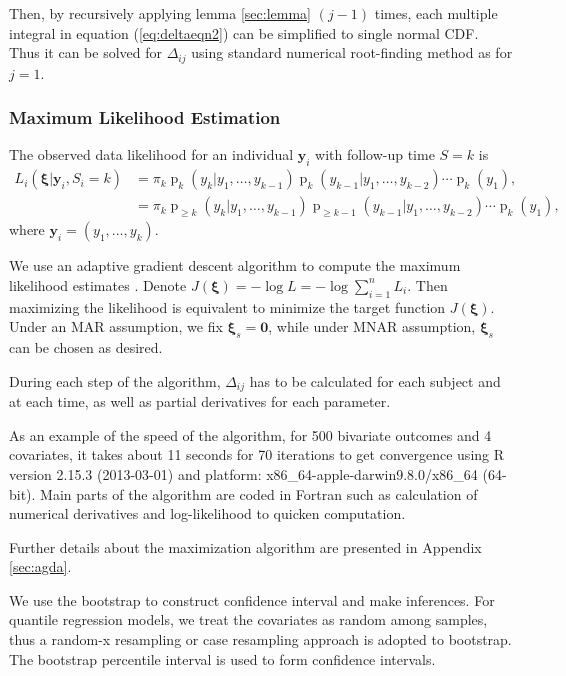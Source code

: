 \documentclass[12pt]{article}
\DeclareMathOperator{\pr}{p}
\begin{document}
\begin{itemize}
  Then, by recursively applying lemma \ref{sec:lemma} $(j-1)$ times,
  each multiple integral in equation (\ref{eq:deltaeqn2}) can be
  simplified to single normal CDF. Thus it can be solved for
  $\Delta_{ij}$ using standard numerical root-finding method as for $j
  = 1$.

\end{itemize}

\subsubsection{Maximum Likelihood Estimation}
\label{sec:mle}

The observed data likelihood for an individual $\bm y_i$ with
follow-up time $S = k$ is
\begin{align} \label{eq:ll} L_i(\bm \xi| \bm y_i, S_{i} = k) & =
  \pi_k\pr_k (y_k | y_1, \ldots, y_{k-1})
  \pr_k (y_{k-1}|y_1, \ldots, y_{k-2}) \cdots \pr_{k} (y_1), \\
  & = \pi_k \pr_{\geq k} (y_k | y_1, \ldots, y_{k-1}) \pr_{\geq k-1}
  (y_{k-1}|y_1, \ldots, y_{k-2}) \cdots \pr_{k} (y_1), \nonumber
\end{align}
where $\bm y_i = (y_1, \ldots, y_k)$.

We use an adaptive gradient descent algorithm to compute the maximum
likelihood estimates \citep{ried1993}. Denote $J(\bm \xi) = - \log L =
- \log \sum_{i = 1}^n L_i$.  Then maximizing the likelihood is
equivalent to minimize the target function $J(\bm \xi)$. Under an MAR
assumption, we fix $\bm \xi_s = \bm 0$, while under MNAR assumption,
$\bm \xi_s $ can be chosen as desired.

During each step of the algorithm, $\Delta_{ij}$ has to be calculated
for each subject and at each time, as well as partial derivatives for
each parameter.

As an example of the speed of the algorithm, for 500 bivariate
outcomes and 4 covariates, it takes about 11 seconds for 70 iterations
to get convergence using R version 2.15.3 (2013-03-01) \citep{R} and
platform: x86\_64-apple-darwin9.8.0/x86\_64 (64-bit). Main parts of
the algorithm are coded in Fortran such as calculation of numerical
derivatives and log-likelihood to quicken computation.

Further details about the maximization algorithm are presented in
Appendix \ref{sec:agda}.

We use the bootstrap \citep{efron1979,efron1993,divison1997} to
construct confidence interval and make inferences.  For quantile
regression models, we treat the covariates as random among samples,
thus a random-x resampling or case resampling approach is adopted to
bootstrap. The bootstrap percentile interval is used to form
confidence intervals.
\end{document}
